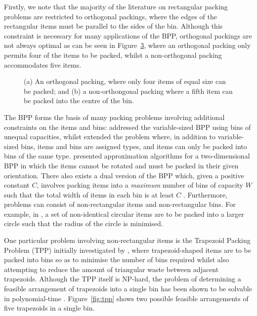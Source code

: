 \documentclass[a4paper,11pt]{article}
\begin{document}
\noindent Firstly, we note that the majority of the literature on rectangular packing problems are restricted to orthogonal packings, where the edges of the rectangular items must be parallel to the sides of the bin. Although this constraint is necessary for many applications of the BPP, orthogonal packings are not always optimal as can be seen in Figure~\ref{fig:orthogonalpackings}, where an orthogonal packing only permits four of the items to be packed, whilst a non-orthogonal packing accommodates five items.

\begin{figure}[h!]
	\centering	
	\begin{subfigure}[h]{0.4\textwidth}
		\centering
		
		\caption{}
		\label{fig:orthogonal}
	\end{subfigure} %
	\begin{subfigure}[h]{0.4\textwidth}
		\centering
		
		\caption{}
		\label{fig:nonorthogonal}
	\end{subfigure}	
	\caption{(a) An orthogonal packing, where only four items of equal size can be packed; and (b) a non-orthongonal packing where a fifth item can be packed into the centre of the bin.}	
	\label{fig:orthogonalpackings}
\end{figure}

The BPP forms the basis of many packing problems involving additional constraints on the items and bins: \citet{haouari2009} addressed the variable-sized BPP using bins of unequal capacities, whilst \citet{zhou2009} extended the problem where, in addition to variable-sized bins, items and bins are assigned types, and items can only be packed into bins of the same type. \citet{lodi1999} presented approximation algorithms for a two-dimensional BPP in which the items cannot be rotated and must be packed in their given orientation. There also exists a dual version of the BPP which, given a positive constant $C$, involves packing items into a \emph{maximum} number of bins of capacity $W$ such that the total width of items in each bin is at least $C$ \citep{csirik1988}. Furthermore, problems can consist of non-rectangular items and non-rectangular bins. For example, in \citet{akeb2009}, a set of non-identical circular items are to be packed into a larger circle such that the radius of the circle is minimised. 

One particular problem involving non-rectangular items is the Trapezoid Packing Problem (TPP) initially investigated by \citet{lewis2011}, where trapezoid-shaped items are to be packed into bins so as to minimise the number of bins required whilst also attempting to reduce the amount of triangular waste between adjacent trapezoids. Although the TPP itself is NP-hard, the problem of determining a feasible arrangement of trapezoids into a single bin has been shown to be solvable in polynomial-time \citep{lewis2017}. Figure~\ref{fig:tpp} shows two possible feasible arrangements of five trapezoids in a single bin. 
\end{document}
